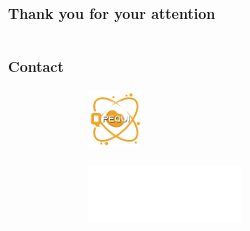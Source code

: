 \documentclass[aspectratio=169,t,xcolor=table]{beamer}
\begin{document}
\begin{frame}
    
    \centering
    \vspace{2cm}
    
    \textbf{\Huge Thank you for your attention}
    
    \ \\
    
    \textbf{Contact}
    \ \\
    
    
    \vspace{2cm}
    \begin{figure}
        \centering
        \begin{subfigure}{0.2\textwidth}
            \centering
            \hspace{-2cm}\includegraphics[height=1.5cm]{lib/logos/qpequi.png}
        \end{subfigure}%
        \qquad 
        \begin{subfigure}{0.2\textwidth}
            \centering
            \includegraphics[height=1.5cm]{lib/logos/ufgw.png}
        \end{subfigure}
      
    \end{figure}
    
\end{frame}
\end{document}
